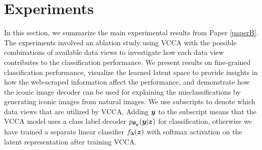 

\section{Experiments}\label{chap3:sec:experiments}

In this section, we summarize the main experimental results from Paper \ref{paperB}. The experiments involved an ablation study using VCCA with the possible combinations of available data views to investigate how each data view contributes to the classification performance. 
We present results on fine-grained classification performance, visualize the learned latent space to provide insights in how the web-scraped information affect the performance, and demonstrate how the iconic image decoder can be used for explaining the misclassifications by generating iconic images from natural images. 
We use subscripts to denote which data views that are utilized by VCCA. Adding ${\bm{y}}$ to the subscript means that the VCCA model uses a class label decoder $p_{{\bm{\theta}}_{{\bm{y}}}}({\bm{y}} | {\bm{z}})$ for classification, otherwise we have trained a separate linear classifier $f_{{\bm{\lambda}}}({\bm{z}})$ with softmax activation on the latent representation after training VCCA. 



